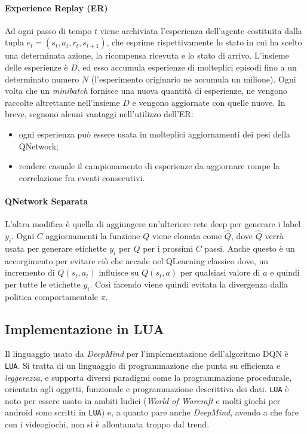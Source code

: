 \documentclass[twoside,twocolumn,10pt]{extarticle}
\theoremstyle{definition}
\begin{document}
		\paragraph*{Experience Replay (ER)}\label{par:er} Ad ogni passo di tempo $t$ viene archiviata l'esperienza dell'agente costituita dalla tupla $e_t = (s_t, a_t, r_t, s_{t + 1})$, che esprime rispettivamente lo stato in cui ha scelto una determinata azione, la ricompensa ricevuta e lo stato di arrivo. L'insieme delle esperienze è $D$, ed esso accumula esperienze di molteplici episodi fino a un determinato numero $N$ (l'esperimento originario ne accumula un milione). Ogni volta che un \textit{minibatch} fornisce una nuova quantità di esperienze, ne vengono raccolte altrettante nell'insieme $D$ e vengono aggiornate con quelle nuove. In breve, seguono alcuni vantaggi nell'utilizzo dell'ER:
		\begin{itemize}
			\item ogni esperienza può essere usata in molteplici aggiornamenti dei pesi della Q\texttwelveudash Network;
			\item rendere casuale il campionamento di esperienze da aggiornare rompe la correlazione fra eventi consecutivi.
		\end{itemize}
	
		\paragraph*{Q\texttwelveudash Network Separata} L'altra modifica è quella di aggiungere un'ulteriore rete deep per generare i label $y_i$. Ogni $C$ aggiornamenti la funzione $Q$ viene clonata come $\hat{Q}$, dove $\hat{Q}$ verrà usata per generare etichette $y_i$ per $Q$ per i prossimi $C$ passi. Anche questo è un accorgimento per evitare ciò che accade nel Q\texttwelveudash Learning classico dove, un incremento di $Q(s_t, a_t)$ influisce su $Q(s_t, a)$ per qualsiasi valore di $a$ e quindi per tutte le etichette $y_i$. Così facendo viene quindi evitata la divergenza dalla politica comportamentale $\pi$.
		
	\subsection{Implementazione in LUA}
		Il linguaggio usato da \textit{DeepMind} per l'implementazione dell'algoritmo DQN è \texttt{LUA}. Si tratta di un linguaggio di programmazione che punta su efficienza e \textit{leggerezza}, e supporta diversi paradigmi come la programmazione procedurale, orientata agli oggetti, funzionale e programmazione descrittiva dei dati. \texttt{LUA} è noto per essere usato in ambiti ludici (\textit{World of Warcraft} e molti giochi per android sono scritti in \texttt{LUA}) e, a quanto pare anche \textit{DeepMind}, avendo a che fare con i videogiochi, non si è allontanata troppo dal trend.
		
\end{document}
